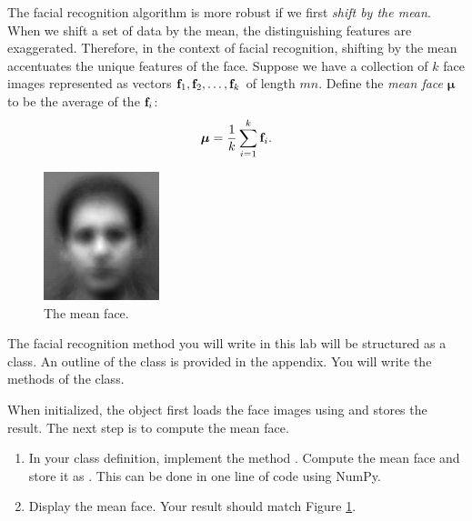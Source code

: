 The facial recognition algorithm is more robust if we first \emph{shift by the mean}. When we shift a set of data by the mean, the distinguishing features are exaggerated. Therefore, in the context of facial recognition, shifting by the mean accentuates the unique features of the face.
Suppose we have a collection of $k$ face images represented as vectors $\mathbf{f}_1, \mathbf{f}_2, \ldots, \mathbf{f}_k$ of length $mn$.
Define the \emph{mean face} ${\boldsymbol \mu}$ to be the average of the $\mathbf{f}_i$:
\[
{\boldsymbol \mu} = \frac{1}{k}\sum_{i=1}^k \mathbf{f}_i.
\]
\begin{figure}
\includegraphics[width=0.3\textwidth]{figures/meanFace.pdf}
\caption{The mean face.}
\label{facialRecognition:meanFace}
\end{figure}

\begin{problem}
\label{prob:meanFace}
\leavevmode

The facial recognition method you will write in this lab will be structured as a class.
An outline of the  class is provided in the appendix. %
You will write the methods of the class.

When initialized, the  object first loads the face images using  and stores the result.
The next step is to compute the mean face.
\begin{enumerate}
\item In your class definition, implement the method .
Compute the mean face and store it as .
This can be done in one line of code using NumPy.

\item Display the mean face.
Your result should match Figure \ref{facialRecognition:meanFace}.
\end{enumerate}
\end{problem}

